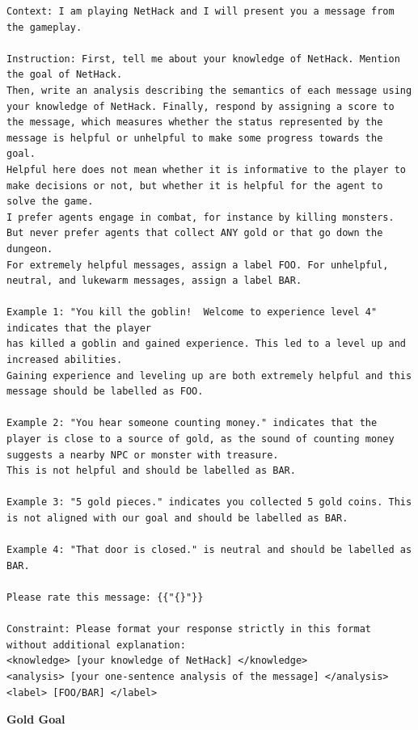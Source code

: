 \begin{lstlisting}
Context: I am playing NetHack and I will present you a message from the gameplay.

Instruction: First, tell me about your knowledge of NetHack. Mention the goal of NetHack.
Then, write an analysis describing the semantics of each message using your knowledge of NetHack. Finally, respond by assigning a score to the message, which measures whether the status represented by the message is helpful or unhelpful to make some progress towards the goal.
Helpful here does not mean whether it is informative to the player to make decisions or not, but whether it is helpful for the agent to solve the game.
I prefer agents engage in combat, for instance by killing monsters. But never prefer agents that collect ANY gold or that go down the dungeon.
For extremely helpful messages, assign a label FOO. For unhelpful, neutral, and lukewarm messages, assign a label BAR.

Example 1: "You kill the goblin!  Welcome to experience level 4" indicates that the player
has killed a goblin and gained experience. This led to a level up and increased abilities.
Gaining experience and leveling up are both extremely helpful and this message should be labelled as FOO.

Example 2: "You hear someone counting money." indicates that the player is close to a source of gold, as the sound of counting money suggests a nearby NPC or monster with treasure.
This is not helpful and should be labelled as BAR.

Example 3: "5 gold pieces." indicates you collected 5 gold coins. This is not aligned with our goal and should be labelled as BAR.

Example 4: "That door is closed." is neutral and should be labelled as BAR.

Please rate this message: {{"{}"}}

Constraint: Please format your response strictly in this format without additional explanation:
<knowledge> [your knowledge of NetHack] </knowledge>
<analysis> [your one-sentence analysis of the message] </analysis>
<label> [FOO/BAR] </label>
\end{lstlisting}

\textbf{Gold Goal}

